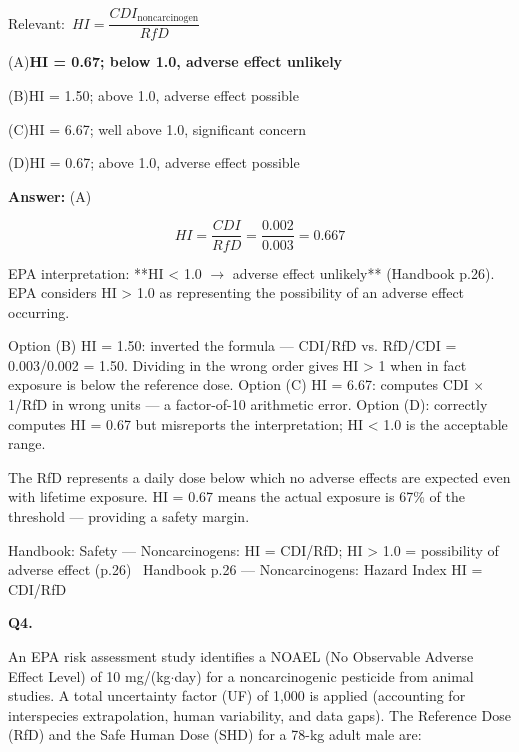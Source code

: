 \documentclass[11pt]{article}
\newcommand{\correct}[1]{\textbf{#1}\;{\color{accent}$\checkmark$}}
\newcommand{\optline}[2]{\par\noindent\hspace{1.2em}(#1)\hspace{0.6em}#2}
\begin{document}
{\small\color{soft}Relevant:}\ $HI = \dfrac{CDI_{\text{noncarcinogen}}}{RfD}$\par\vspace{3pt}
\optline{A}{\correct{HI = 0.67; below 1.0, adverse effect unlikely}}
\optline{B}{HI = 1.50; above 1.0, adverse effect possible}
\optline{C}{HI = 6.67; well above 1.0, significant concern}
\optline{D}{HI = 0.67; above 1.0, adverse effect possible}
\par\vspace{3pt}
\vspace{2pt}\par\noindent\colorbox{boxbg}{\parbox{\dimexpr\linewidth-2\fboxsep\relax}{%
\vspace{2pt}\textbf{Answer:} (A)\par\vspace{2pt}
{\small \[HI = \frac{CDI}{RfD} = \frac{0.002}{0.003} = 0.667\]

EPA interpretation: **HI < 1.0 $\rightarrow$ adverse effect unlikely** (Handbook p.26). EPA considers HI > 1.0 as representing the possibility of an adverse effect occurring.

Option (B) HI = 1.50: inverted the formula --- CDI/RfD vs. RfD/CDI = 0.003/0.002 = 1.50. Dividing in the wrong order gives HI > 1 when in fact exposure is below the reference dose. Option (C) HI = 6.67: computes CDI $\times$ 1/RfD in wrong units --- a factor-of-10 arithmetic error. Option (D): correctly computes HI = 0.67 but misreports the interpretation; HI < 1.0 is the acceptable range.

The RfD represents a daily dose below which no adverse effects are expected even with lifetime exposure. HI = 0.67 means the actual exposure is 67\% of the threshold --- providing a safety margin.}\par\vspace{2pt}
{\footnotesize\color{soft}Handbook: Safety --- Noncarcinogens: HI = CDI/RfD; HI > 1.0 = possibility of adverse effect (p.26) \textbullet\ Handbook p.26 --- Noncarcinogens: Hazard Index HI = CDI/RfD}\vspace{2pt}
}}
\vspace{9pt}
\filbreak
\textbf{\color{accent}Q4.}\quad {\small\color{soft}[D13-Q04 \textbullet\ MCQ \textbullet\ Reference Dose --- RfD = NOAEL/UF (SI)]}\par\vspace{2pt}
An EPA risk assessment study identifies a NOAEL (No Observable Adverse Effect Level) of 10 mg/(kg$\cdot$day) for a noncarcinogenic pesticide from animal studies. A total uncertainty factor (UF) of 1,000 is applied (accounting for interspecies extrapolation, human variability, and data gaps). The Reference Dose (RfD) and the Safe Human Dose (SHD) for a 78-kg adult male are:\par\vspace{3pt}
\end{document}
